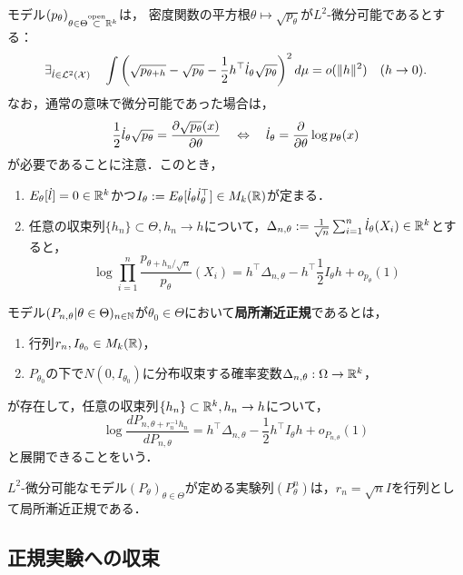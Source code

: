 \documentclass[uplatex,dvipdfmx]{jsreport}
\begin{document}
\begin{theorem}[局所漸近正規性の十分条件]
    モデル$(p_\theta)_{\theta\in\Theta\overset{\mathrm{open}}{\subset}\mathbb{R}^k}$は，
    密度関数の平方根$\theta\mapsto\sqrt{p_\theta}$が$L^2$-微分可能であるとする：
    \[\exists_{\dot{l}\in\mathcal{L}^2(\mathcal{X})}\quad\int\left(\sqrt{p_{\theta+h}}-\sqrt{p_\theta}-\frac{1}{2}h^\top \dot{l}_\theta\sqrt{p_\theta}\right)^2d\mu=o(\|h\|^2)\quad(h\to0).\]
    なお，通常の意味で微分可能であった場合は，
    \[\frac{1}{2}\dot{l}_\theta\sqrt{p_\theta}=\frac{\partial \sqrt{p_\theta}(x)}{\partial \theta}\quad\Leftrightarrow\quad \dot{l}_\theta=\frac{\partial }{\partial \theta}\log p_\theta(x)\]
    が必要であることに注意．このとき，
    \begin{enumerate}
        \item $E_\theta[\dot{l}]=0\in\mathbb{R}^k$かつ$I_\theta:=E_\theta[\dot{l}_\theta\dot{l}_\theta^\top]\in M_k(\mathbb{R})$が定まる．
        \item 任意の収束列$\{h_n\}\subset\Theta,h_n\to h$について，$\Delta_{n,\theta}:=\frac{1}{\sqrt{n}}\sum^n_{i=1}\dot{l}_\theta(X_i)\in\mathbb{R}^k$とすると，
        \[\log\prod_{i=1}^n\frac{p_{\theta+h_n/\sqrt{n}}}{p_\theta}(X_i)=h^\top\Delta_{n,\theta}-h^\top\frac{1}{2}I_\theta h+o_{p_\theta}(1)\]
    \end{enumerate}
\end{theorem}

\begin{definition}
    モデル$(P_{n,\theta}|\theta\in\Theta)_{n\in\mathbb{N}}$が$\theta_0\in\Theta$において\textbf{局所漸近正規}であるとは，
    \begin{enumerate}
        \item 行列$r_n,I_{\theta_0}\in M_k(\mathbb{R})$，
        \item $P_{\theta_0}$の下で$N(0,I_{\theta_0})$に分布収束する確率変数$\Delta_{n,\theta}:\Omega\to\mathbb{R}^k$，
    \end{enumerate}
    が存在して，任意の収束列$\{h_n\}\subset\mathbb{R}^k,h_n\to h$について，
    \[\log\frac{dP_{n,\theta+r_n^{-1}h_n}}{dP_{n,\theta}}=h^\top\Delta_{n,\theta}-\frac{1}{2}h^\top I_\theta h+o_{P_{n,\theta}}(1)\]
    と展開できることをいう．
\end{definition}
\begin{example}
    $L^2$-微分可能なモデル$(P_\theta)_{\theta\in\Theta}$が定める実験列$(P^n_\theta)$は，$r_n=\sqrt{n}I$を行列として局所漸近正規である．
\end{example}

\subsection{正規実験への収束}
\end{document}
